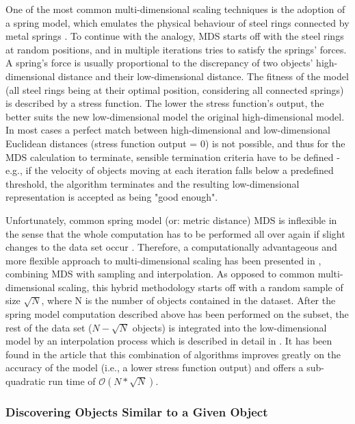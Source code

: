 One of the most common multi-dimensional scaling techniques is the adoption of a spring model, which emulates the physical behaviour of steel rings connected by metal springs \cite{Morrison:2003:FMS}. To continue with the analogy, MDS starts off with the steel rings at random positions, and in multiple iterations tries to satisfy the springs' forces. A spring's force is usually proportional to the discrepancy of two objects' high-dimensional distance and their low-dimensional distance. The fitness of the model (all steel rings being at their optimal position, considering all connected springs) is described by a stress function. The lower the stress function's output, the better suits the new low-dimensional model the original high-dimensional model. In most cases a perfect match between high-dimensional and low-dimensional Euclidean distances (stress function output = 0) is not possible, and thus for the MDS calculation to terminate, sensible termination criteria have to be defined - e.g., if the velocity of objects moving at each iteration falls below a predefined threshold, the algorithm terminates and the resulting low-dimensional representation is accepted as being "good enough".

Unfortunately, common spring model (or: metric distance) MDS is inflexible in the sense that the whole computation has to be performed all over again if slight changes to the data set occur \cite{Morrison:2003:FMS}. 
Therefore, a computationally advantageous and more flexible approach to multi-dimensional scaling has been presented in \cite{Morrison:2003:FMS}, combining MDS with sampling and interpolation. As opposed to common multi-dimensional
scaling, this hybrid methodology starts off with a random sample of size $\sqrt{N}$, where N is the number of objects contained in the dataset. After the spring model computation described above has been performed on the subset, the rest of the data set ($N - \sqrt{N}$ objects) is integrated into the low-dimensional model by an interpolation process which is described in detail in \cite{Morrison:2003:FMS}. It has been found in the article that this combination of algorithms improves greatly on the accuracy of the model (i.e., a lower stress function output) and offers a sub-quadratic run time of $\mathcal O(N*\sqrt{N})$.

\subsubsection{Discovering Objects Similar to a Given Object}

